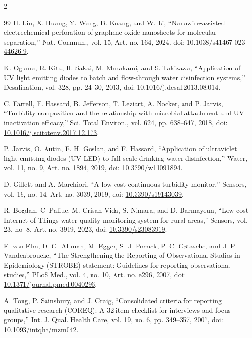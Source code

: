 \documentclass{ieeeaccess}
\begin{document}
\begin{multicols}{2}
\begin{thebibliography}{99}
 H. Liu, X. Huang, Y. Wang, B. Kuang, and W. Li, ``Nanowire-assisted electrochemical perforation of graphene oxide nanosheets for molecular separation,'' Nat. Commun., vol. 15, Art. no. 164, 2024, doi: \href{https://doi.org/10.1038/s41467-023-44626-9}{10.1038/s41467-023-44626-9}.

 K. Oguma, R. Kita, H. Sakai, M. Murakami, and S. Takizawa, ``Application of UV light emitting diodes to batch and flow-through water disinfection systems,'' Desalination, vol. 328, pp. 24--30, 2013, doi: \href{https://doi.org/10.1016/j.desal.2013.08.014}{10.1016/j.desal.2013.08.014}.

 C. Farrell, F. Hassard, B. Jefferson, T. Leziart, A. Nocker, and P. Jarvis, ``Turbidity composition and the relationship with microbial attachment and UV inactivation efficacy,'' Sci. Total Environ., vol. 624, pp. 638--647, 2018, doi: \href{https://doi.org/10.1016/j.scitotenv.2017.12.173}{10.1016/j.scitotenv.2017.12.173}.

 P. Jarvis, O. Autin, E. H. Goslan, and F. Hassard, ``Application of ultraviolet light-emitting diodes (UV-LED) to full-scale drinking-water disinfection,'' Water, vol. 11, no. 9, Art. no. 1894, 2019, doi: \href{https://doi.org/10.3390/w11091894}{10.3390/w11091894}.

 D. Gillett and A. Marchiori, ``A low-cost continuous turbidity monitor,'' Sensors, vol. 19, no. 14, Art. no. 3039, 2019, doi: \href{https://doi.org/10.3390/s19143039}{10.3390/s19143039}.

 R. Bogdan, C. Paliuc, M. Crisan-Vida, S. Nimara, and D. Barmayoun, ``Low-cost Internet-of-Things water-quality monitoring system for rural areas,'' Sensors, vol. 23, no. 8, Art. no. 3919, 2023, doi: \href{https://doi.org/10.3390/s23083919}{10.3390/s23083919}.

 E. von Elm, D. G. Altman, M. Egger, S. J. Pocock, P. C. Gøtzsche, and J. P. Vandenbroucke, ``The Strengthening the Reporting of Observational Studies in Epidemiology (STROBE) statement: Guidelines for reporting observational studies,'' PLoS Med., vol. 4, no. 10, Art. no. e296, 2007, doi: \href{https://doi.org/10.1371/journal.pmed.0040296}{10.1371/journal.pmed.0040296}.

 A. Tong, P. Sainsbury, and J. Craig, ``Consolidated criteria for reporting qualitative research (COREQ): A 32-item checklist for interviews and focus groups,'' Int. J. Qual. Health Care, vol. 19, no. 6, pp. 349--357, 2007, doi: \href{https://doi.org/10.1093/intqhc/mzm042}{10.1093/intqhc/mzm042}.


\end{thebibliography}
\end{multicols}
\end{document}
